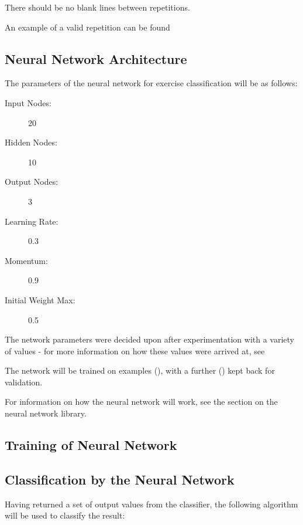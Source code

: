 \documentclass[a4paper]{article}
\begin{document}
There should be no blank lines between repetitions.

An example of a valid repetition can be found 

\subsection{Neural Network Architecture}%

The parameters of the neural network for exercise classification will be as follows:

\begin{description}
\item[Input Nodes: ] 20
\item[Hidden Nodes: ] 10
\item[Output Nodes: ] 3
\item[Learning Rate:] 0.3
\item[Momentum: ] 0.9
\item[Initial Weight Max: ] 0.5
\end{description}


The network parameters were decided upon after experimentation with a variety of values - for more information on how these values were arrived at, see 

The network will be trained on  examples (), with a further  () kept back for validation.

For information on how the neural network will work, see the section on the neural network library. 

\subsection{Training of Neural Network}%


\subsection{Classification by the Neural Network}%

Having returned a set of output values from the classifier, the following algorithm will be used to classify the result:
\end{document}
